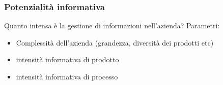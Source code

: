 \subsubsection{Potenzialit\`a informativa}
\label{subs:Potenzialit\`a informativa}
Quanto intensa \`e la gestione di informazioni nell'azienda?
Parametri:
\begin{itemize}
  \item Complessit\`a dell'azienda (grandezza, diversit\`a dei prodotti etc)
  \item intensit\`a informativa di prodotto
  \item intensit\`a informativa di processo
\end{itemize}
